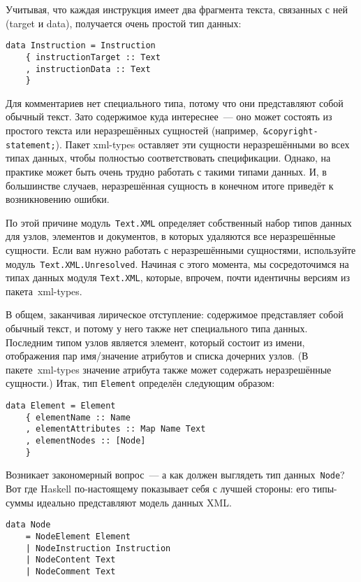 Учитывая, что каждая инструкция имеет два фрагмента текста, связанных с ней
(target и data), получается очень простой тип данных:
\begin{lstlisting}
data Instruction = Instruction
    { instructionTarget :: Text
    , instructionData :: Text
    }
\end{lstlisting}

Для комментариев нет специального типа, потому что они представляют собой
обычный текст. Зато содержимое куда интереснее~--- оно может состоять из
простого текста или неразрешённых сущностей
(например,~\lstinline!&copyright-statement;!). Пакет xml-types
оставляет эти сущности неразрешёнными во всех типах данных, чтобы полностью
соответствовать спецификации. Однако, на практике может быть очень трудно
работать с такими типами данных. И, в большинстве случаев, неразрешённая
сущность в конечном итоге приведёт к возникновению ошибки.

По этой причине модуль~\lstinline!Text.XML! определяет собственный набор типов
данных для узлов, элементов и документов, в которых удаляются все неразрешённые
сущности. Если вам нужно работать с неразрешёнными сущностями, используйте
модуль~\lstinline!Text.XML.Unresolved!. Начиная с этого момента, мы
сосредоточимся на типах данных модуля \lstinline!Text.XML!, которые, впрочем,
почти идентичны версиям из пакета~xml-types.

В общем, заканчивая лирическое отступление: содержимое представляет собой
обычный текст, и потому у него также нет специального типа данных. Последним
типом узлов является элемент, который состоит из имени, отображения пар
имя/значение атрибутов и списка дочерних узлов. (В пакете~xml-types
значение атрибута также может содержать неразрешённые сущности.) Итак, тип
\lstinline!Element! определён следующим образом:
\begin{lstlisting}
data Element = Element
    { elementName :: Name
    , elementAttributes :: Map Name Text
    , elementNodes :: [Node]
    }
\end{lstlisting}

Возникает закономерный вопрос~--- а как должен выглядеть тип
данных~\lstinline!Node!? Вот где Haskell по-настоящему показывает себя с лучшей
стороны: его типы-суммы идеально представляют модель данных XML.

\begin{lstlisting}
data Node
    = NodeElement Element
    | NodeInstruction Instruction
    | NodeContent Text
    | NodeComment Text
\end{lstlisting}

